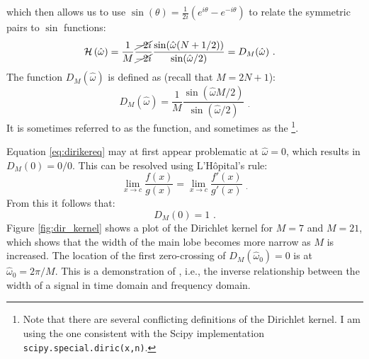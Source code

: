 \noindent which then allows us to use $\sin(\theta)=\frac{1}{2i}(e^{i\theta}-e^{-i\theta})$
to relate the symmetric pairs to $\sin$ functions:
\begin{align}
    \mathcal{H}\left(\hat{\omega}\right) & = \frac{1}{M} \frac{\cancel{-2i}}{\cancel{-2i}} \frac{ \sin(\hat{\omega} (N+1/2)) }{\sin(\hat{\omega}/2)} = D_{M}(\hat{\omega}) \,\,.
\end{align}
The function $D_M(\hat{\omega})$ is defined as (recall that $M=2N+1$):
\begin{equation}
    \boxed{
        D_M(\hat{\omega}) = \frac{1}{M}\frac{ \sin(\hat{\omega}M/2) }{\sin(\hat{\omega}/2)}
    }\label{eq:dirikereq} \,\, _.
\end{equation}
It is sometimes referred to as the \emph{} function, and sometimes as
the \emph{}\footnote{Note that there
    are several conflicting definitions of the Dirichlet kernel. I am
    using the one consistent with the Scipy
    implementation \texttt{scipy.special.diric(x,n)}.}.

Equation \ref{eq:dirikereq} may at first appear problematic at
$\hat{\omega}=0$, which results in $D_M(0)=0/0$.
This can be resolved using L'H\^opital's rule:
\begin{equation}
    \lim_{x\rightarrow c} \frac{f(x)}{g(x)} = \lim_{x\rightarrow c} \frac{f'(x)}{g'(x)} \,\, _.
\end{equation}
From this it follows that:
\begin{equation}
    D_M(0) = 1 \,\,.
\end{equation}
Figure \ref{fig:dir_kernel} shows a plot of the Dirichlet kernel for
$M=7$ and $M=21$, which shows that the width of the main lobe becomes
more narrow as $M$ is increased. The location of the first
zero-crossing of $D_M(\hat{\omega}_0)=0$ is at
$\hat{\omega}_0=2\pi/M$. This is a demonstration
of \emph{},
i.e., the inverse relationship between the width of a signal in time
domain and frequency domain.


